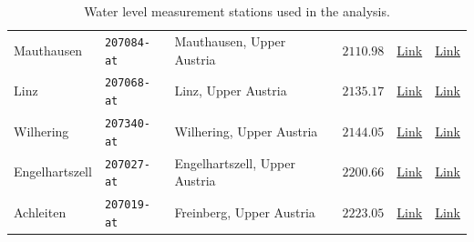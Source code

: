 \begin{table}[htbp]
\begin{tabularx}{\textwidth}{@{} l l X l c X @{}}
        Mauthausen &
        \texttt{207084-at} &
        Mauthausen, Upper Austria &
        $2110.98$ &
        \href{https://pegelalarm.at/paw/?initHideSms=true\&commonid=207084-at}{Link} \cite{FloodAlertWaterLevels} &
        \href{https://hydro.ooe.gv.at/\#/overview/Wasserstand/station/16669/Mauthausen/Wasserstand?period=P7D}{Link} \cite{HydrographischerDienstOberosterreich} \\

        Linz &
        \texttt{207068-at} &
        Linz, Upper Austria &
        $2135.17$ &
        \href{https://pegelalarm.at/paw/?initHideSms=true\&commonid=207068-at}{Link} \cite{FloodAlertWaterLevels} &
        \href{https://hydro.ooe.gv.at/\#/overview/Wasserstand/station/16668/Linz/Wasserstand?period=P7D}{Link} \cite{HydrographischerDienstOberosterreich} \\

        Wilhering &
        \texttt{207340-at} &
        Wilhering, Upper Austria &
        $2144.05$ &
        \href{https://pegelalarm.at/paw/?initHideSms=true\&commonid=207340-at}{Link} \cite{FloodAlertWaterLevels} &
        \href{https://hydro.ooe.gv.at/\#/overview/Wasserstand/station/16671/Wilhering/Wasserstand?period=P7D}{Link} \cite{HydrographischerDienstOberosterreich} \\

        Engelhartszell &
        \texttt{207027-at} &
        Engelhartszell, Upper Austria &
        $2200.66$ &
        \href{https://pegelalarm.at/paw/?initHideSms=true\&commonid=207027-at}{Link} \cite{FloodAlertWaterLevels} &
        \href{https://hydro.ooe.gv.at/\#/overview/Wasserstand/station/16665/Engelhartszell/Wasserstand?period=P7D}{Link} \cite{HydrographischerDienstOberosterreich} \\

        Achleiten &
        \texttt{207019-at} &
        Freinberg, Upper Austria &
        $2223.05$ &
        \href{https://pegelalarm.at/paw/?initHideSms=true\&commonid=207019-at}{Link} \cite{FloodAlertWaterLevels} &
        \href{https://hydro.ooe.gv.at/\#/overview/Wasserstand/station/16664/Achleiten/Wasserstand?period=P7D}{Link} \cite{HydrographischerDienstOberosterreich} \\
        \bottomrule 
    \end{tabularx}
    \caption{Water level measurement stations used in the analysis.}
    \label{tab:water-level-stations}
\end{table}
